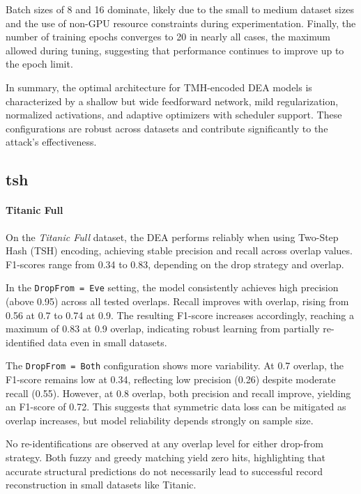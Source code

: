 Batch sizes of 8 and 16 dominate, likely due to the small to medium dataset sizes and the use of non-GPU resource constraints during experimentation. Finally, the number of training epochs converges to 20 in nearly all cases, the maximum allowed during tuning, suggesting that performance continues to improve up to the epoch limit.

In summary, the optimal architecture for TMH-encoded DEA models is characterized by a shallow but wide feedforward network, mild regularization, normalized activations, and adaptive optimizers with scheduler support. These configurations are robust across datasets and contribute significantly to the attack's effectiveness.

\subsection{\ac{tsh}}

\paragraph{Titanic Full}

On the \textit{Titanic Full} dataset, the DEA performs reliably when using Two-Step Hash (TSH) encoding, achieving stable precision and recall across overlap values. F1-scores range from 0.34 to 0.83, depending on the drop strategy and overlap.

In the \texttt{DropFrom = Eve} setting, the model consistently achieves high precision (above 0.95) across all tested overlaps. Recall improves with overlap, rising from 0.56 at 0.7 to 0.74 at 0.9. The resulting F1-score increases accordingly, reaching a maximum of 0.83 at 0.9 overlap, indicating robust learning from partially re-identified data even in small datasets.

The \texttt{DropFrom = Both} configuration shows more variability. At 0.7 overlap, the F1-score remains low at 0.34, reflecting low precision (0.26) despite moderate recall (0.55). However, at 0.8 overlap, both precision and recall improve, yielding an F1-score of 0.72. This suggests that symmetric data loss can be mitigated as overlap increases, but model reliability depends strongly on sample size.

No re-identifications are observed at any overlap level for either drop-from strategy. Both fuzzy and greedy matching yield zero hits, highlighting that accurate structural predictions do not necessarily lead to successful record reconstruction in small datasets like Titanic.

